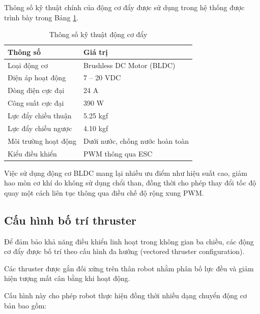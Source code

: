 \documentclass[../DoAn.tex]{subfiles}
\begin{document}
Thông số kỹ thuật chính của động cơ đẩy được sử dụng trong hệ thống được trình bày trong Bảng \ref{tab:thruster_specification}.

\begin{table}[H]
\centering
\caption{Thông số kỹ thuật động cơ đẩy}
\label{tab:thruster_specification}
\begin{tabular}{|p{6cm}|p{6cm}|}
\hline
\textbf{Thông số} & \textbf{Giá trị} \\ \hline

Loại động cơ & Brushless DC Motor (BLDC) \\ \hline

Điện áp hoạt động & 7 -- 20 VDC \\ \hline

Dòng điện cực đại & 24 A \\ \hline

Công suất cực đại & 390 W \\ \hline

Lực đẩy chiều thuận & 5.25 kgf \\ \hline

Lực đẩy chiều ngược & 4.10 kgf \\ \hline

Môi trường hoạt động & Dưới nước, chống nước hoàn toàn \\ \hline

Kiểu điều khiển & PWM thông qua ESC \\ \hline

\end{tabular}
\end{table}

Việc sử dụng động cơ BLDC mang lại nhiều ưu điểm như hiệu suất cao, giảm hao mòn cơ khí do không sử dụng chổi than, đồng thời cho phép thay đổi tốc độ quay một cách liên tục thông qua điều chế độ rộng xung PWM.

\subsection{Cấu hình bố trí thruster}

Để đảm bảo khả năng điều khiển linh hoạt trong không gian ba chiều, các động cơ đẩy được bố trí theo cấu hình đa hướng (vectored thruster configuration).

Các thruster được gắn đối xứng trên thân robot nhằm phân bố lực đều và giảm hiện tượng mất cân bằng khi hoạt động.

Cấu hình này cho phép robot thực hiện đồng thời nhiều dạng chuyển động cơ bản bao gồm:
\end{document}
